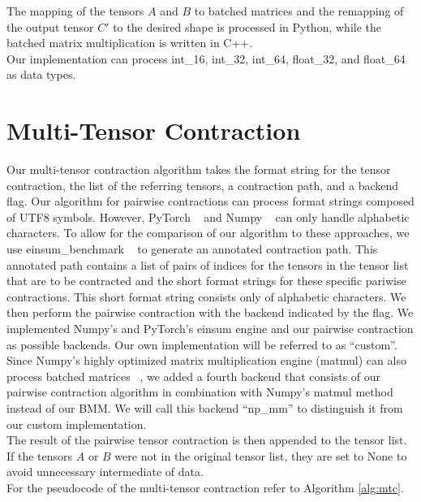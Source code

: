 \noindent The mapping of the tensors $A$ and $B$ to batched matrices and the remapping of the output tensor $C'$ to the desired shape is processed in Python, while the batched matrix multiplication is written in C++. \\
Our implementation can process int\_16, int\_32, int\_64, float\_32, and float\_64 as data types.


\section{Multi-Tensor Contraction}
Our multi-tensor contraction algorithm takes the format string for the tensor contraction, the list of the referring tensors, a contraction path, and a backend flag. Our algorithm for pairwise contractions can process format strings composed of UTF8 symbols. However, PyTorch ~\cite{PyTorch} and Numpy ~\cite{Numpy} can only handle alphabetic characters. 
To allow for the comparison of our algorithm to these approaches, we use einsum\_benchmark ~\cite{blacher2024einsum} to generate an annotated contraction path. This annotated path contains a list of pairs of indices for the tensors in the tensor list that are to be contracted and the short format strings for these specific pariwise contractions. 
This short format string consists only of alphabetic characters. We then perform the pairwise contraction with the backend indicated by the flag. 
We implemented Numpy's and PyTorch's einsum engine and our pairwise contraction as possible backends. Our own implementation will be referred to as ``custom''. Since Numpy's highly optimized matrix multiplication engine (matmul) can also process batched matrices ~\cite{Numpy}, we added a fourth backend that consists of our pairwise contraction algorithm in combination with Numpy's matmul method instead of our BMM. We will call this backend ``np\_mm'' to distinguish it from our custom implementation. \\
The result of the pairwise tensor contraction is then appended to the tensor list. If the tensors $A$ or $B$ were not in the original tensor list, they are set to None to avoid unnecessary intermediate of data.\\
For the pseudocode of the multi-tensor contraction refer to Algorithm \ref{alg:mtc}.

